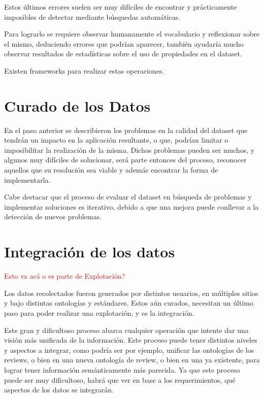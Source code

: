 Estos últimos errores suelen ser muy difíciles de encontrar y prácticamente imposibles de detectar mediante búsquedas automáticas.

Para lograrlo se requiere observar humanamente el vocabulario y reflexionar sobre el mismo, deduciendo errores que podrían aparecer, también ayudaría mucho observar resultados de estadísticas sobre el uso de propiedades en el dataset.

Existen frameworks para realizar estas operaciones.

%
\section{Curado de los Datos}

En el paso anterior se describieron los problemas en la calidad del dataset que tendrán un impacto en la aplicación resultante, 
o que, podrían limitar o imposibilitar la realización de la misma. Dichos problemas pueden ser muchos, y algunos muy difíciles
de solucionar, será parte entonces del proceso, reconocer aquellos que su resolución sea viable y además encontrar la forma de 
implementarla.

Cabe destacar que el proceso de evaluar el dataset en búsqueda de problemas y implementar soluciones es iterativo, debido a que 
una mejora puede conllevar a la detección de nuevos problemas.

%

\section{Integración de los datos}
\begin{framed}
\textcolor{red}{Esto va acá o es parte de Explotación?}
\end{framed}


Los datos recolectados fueron generados por distintos usuarios, en múltiples sitios y bajo distintas ontologías y estándares.
Estos aún curados, necesitan un último paso para poder realizar una explotación, y es la integración.

Este gran y dificultoso proceso abarca cualquier operación que intente dar una visión más unificada de la información. Este
proceso puede tener distintos niveles y aspectos a integrar, como podría ser por ejemplo, unificar las ontologías de los reviews, o bien
en una nueva ontología de review, o bien en una ya existente, para lograr tener información semánticamente más parecida. Ya 
que este proceso puede ser muy dificultoso, habrá que ver en base a los requerimientos, qué aspectos de los datos se integrarán.

